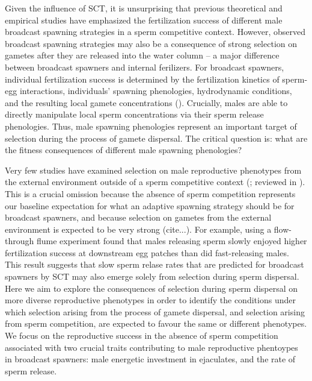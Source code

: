 \documentclass{article}
\begin{document}
Given the influence of SCT, it is unsurprising that previous theoretical and empirical studies have emphasized the fertilization success of different male broadcast spawning strategies in a sperm competitive context. However, observed broadcast spawning strategies may also be a consequence of strong selection on gametes after they are released into the water column -- a major difference between broadcast spawners and internal ferilizers. For broadcast spawners, individual fertilization success is determined by the fertilization kinetics of sperm-egg interactions, individuals' spawning phenologies, hydrodynamic conditions, and the resulting local gamete concentrations (\citealt{DennyShib1989, Levitan1991, Levitan2002, Marshall2002, Levitan2004}). Crucially, males are able to directly manipulate local sperm concentrations via their sperm release phenologies. Thus, male spawning phenologies represent an important target of selection during the process of gamete dispersal. The critical question is: what are the fitness consequences of different male spawning phenologies? 

Very few studies have examined selection on male reproductive phenotypes from the external environment outside of a sperm competitive context (\citealt{Levitan2005, MarshallBolton2007}; reviewed in \citealt{LotterhosLevitan2011}). This is a crucial omission because the absence of sperm competition represents our baseline expectation for what an adaptive spawning strategy should be for broadcast spawners, and because selection on gametes from the external environment is expected to be very strong (cite...\citealt{DennyShib1989,Levitan2005,LotterhosLevitan2011}). For example, using a flow-through flume experiment \citet{BodeMarshall2007} found that males releasing sperm slowly enjoyed higher fertilization success at downstream egg patches than did fast-releasing males. This result suggests that slow sperm relase rates that are predicted for broadcast spawners by SCT may also emerge solely from selection during sperm dispersal. Here we aim to explore the consequences of selection during sperm dispersal on more diverse reproductive phenotypes in order to identify the conditions under which selection arising from the process of gamete dispersal, and selection arising from sperm competition, are expected to favour the same or different phenotypes. We focus on the reproductive success in the absence of sperm competition associated with two crucial traits contributing to male reproductive phentoypes in broadcast spawners: male energetic investment in ejaculates, and the rate of sperm release. 
\end{document}
